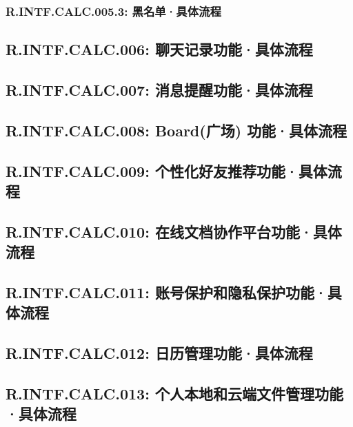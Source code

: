         \subsubsection{R.INTF.CALC.005.3: 黑名单·具体流程}
    \subsection{R.INTF.CALC.006: 聊天记录功能·具体流程}
    \subsection{R.INTF.CALC.007: 消息提醒功能·具体流程}
    \subsection{R.INTF.CALC.008: Board(广场) 功能·具体流程}
    \subsection{R.INTF.CALC.009: 个性化好友推荐功能·具体流程}
    \subsection{R.INTF.CALC.010: 在线文档协作平台功能·具体流程}
    \subsection{R.INTF.CALC.011: 账号保护和隐私保护功能·具体流程}
    \subsection{R.INTF.CALC.012: 日历管理功能·具体流程}
    \subsection{R.INTF.CALC.013: 个人本地和云端文件管理功能·具体流程}
